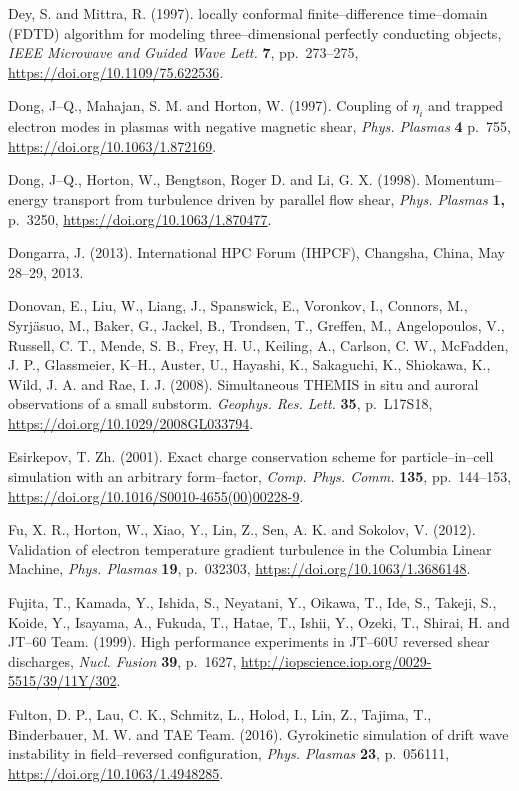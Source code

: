 \documentclass[a4paper,openany,12pt]{book}
\begin{document}
\begin{thebibliography}{100}
\bibitem{}
Dey, S. and Mittra, R. (1997). locally conformal finite--difference time--domain (FDTD) algorithm for modeling three--dimensional perfectly conducting objects, \emph{IEEE Microwave and Guided Wave Lett.} \textbf{7}, pp.~273--275, \url{https://doi.org/10.1109/75.622536}.

\bibitem{}
Dong, J--Q., Mahajan, S. M. and Horton, W. (1997). Coupling of $\eta_i$ and trapped electron modes in plasmas with negative magnetic shear, {\em Phys. Plasmas} \textbf{4} p.~755,
\url{https://doi.org/10.1063/1.872169}.

\bibitem{}
Dong, J--Q., Horton, W., Bengtson, Roger D. and Li, G. X. (1998). Momentum--energy transport from turbulence driven by parallel flow shear, \emph{Phys. Plasmas} \textbf{1,} p.~3250, \url{https://doi.org/10.1063/1.870477}.

\bibitem{}
Dongarra, J. (2013). International HPC Forum (IHPCF), Changsha, China, May 28--29, 2013.

\bibitem{}
Donovan, E., Liu, W., Liang, J., Spanswick, E., Voronkov, I., Connors, M., Syrj\"asuo, M., Baker, G., Jackel, B., Trondsen, T., Greffen, M., Angelopoulos, V., Russell, C. T., Mende, S. B., Frey, H. U., Keiling, A., Carlson, C. W., McFadden, J. P., Glassmeier, K--H., Auster, U., Hayashi, K., Sakaguchi, K., Shiokawa, K., Wild, J. A. and Rae, I. J. (2008). Simultaneous THEMIS in situ and auroral observations of a small substorm. \emph{Geophys. Res. Lett.} \textbf{35}, p.~L17S18, \url{https://doi.org/10.1029/2008GL033794}.

\bibitem{}
Esirkepov, T. Zh. (2001). Exact charge conservation scheme for particle--in--cell simulation with an arbitrary form--factor, \emph{Comp. Phys. Comm.} \textbf{135}, pp.~144--153, 
\url{https://doi.org/10.1016/S0010-4655(00)00228-9}.

\bibitem{}
Fu, X. R., Horton, W., Xiao, Y., Lin, Z., Sen, A. K. and Sokolov, V. (2012). Validation of electron temperature gradient turbulence in the Columbia Linear Machine, \emph{Phys. Plasmas} \textbf{19}, p.~032303, 
\url{https://doi.org/10.1063/1.3686148}.

\bibitem{}
Fujita, T., Kamada, Y., Ishida, S., Neyatani, Y., Oikawa, T., Ide, S., Takeji, S., Koide, Y., Isayama, A., Fukuda, T., Hatae, T., Ishii, Y., Ozeki, T., Shirai, H. and JT--60 Team. (1999). High performance experiments in JT--60U reversed shear discharges, \emph{Nucl. Fusion} \textbf{39}, p.~1627, \url{http://iopscience.iop.org/0029-5515/39/11Y/302}.

\bibitem{}
Fulton, D. P., Lau, C. K., Schmitz, L., Holod, I., Lin, Z., Tajima, T., Binderbauer, M. W. and TAE Team. (2016). Gyrokinetic simulation of drift wave instability in field--reversed configuration, \emph{Phys. Plasmas} \textbf{23}, 
p.~056111, \url{https://doi.org/10.1063/1.4948285}.


\end{thebibliography}
\end{document}
